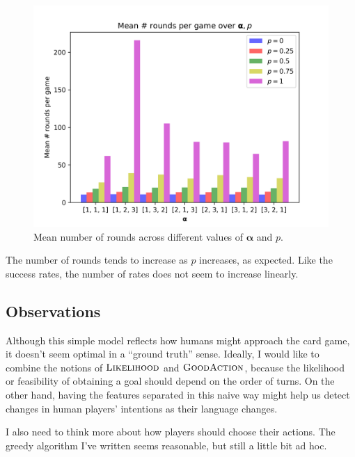 \documentclass[11pt]{article}
\newcommand{\lkhd}{\textsc{Likelihood}}
\newcommand{\goodaction}{\textsc{GoodAction}}
\begin{document}
\begin{figure}[hpt]
  \centering
  \captionsetup{justification=centering,margin=2cm}
  \includegraphics[scale=0.8]{../plots/roundsAlphaP.png}
  \caption{Mean number of rounds across different values of $\bm{\alpha}$ and $p$.} %
  \label{fig:rounds}
\end{figure}

The number of rounds tends to increase as $p$ increases, as expected. Like the success rates, the number of rates does not seem to increase linearly.

\subsection{Observations}

Although this simple model reflects how humans might approach the card game, it doesn't seem optimal in a ``ground truth'' sense. Ideally, I would like to combine the notions of $\lkhd$ and $\goodaction$, because the likelihood or feasibility of obtaining a goal should depend on the order of turns. On the other hand, having the features separated in this naive way might help us detect changes in human players' intentions as their language changes.

I also need to think more about how players should choose their actions. The greedy algorithm I've written seems reasonable, but still a little bit ad hoc.
\end{document}
